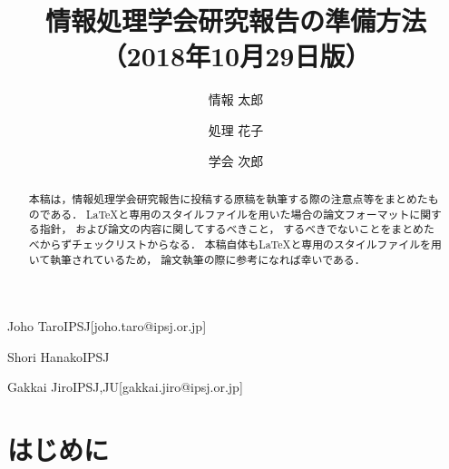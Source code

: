 \documentclass[submit,techrep,noauthor]{ipsj-lualatex}
\begin{document}
\title{情報処理学会研究報告の準備方法\\
（2018年10月29日版）}





\author{情報 太郎}{Joho Taro}{IPSJ}[joho.taro@ipsj.or.jp]
\author{処理 花子}{Shori Hanako}{IPSJ}
\author{学会 次郎}{Gakkai Jiro}{IPSJ,JU}[gakkai.jiro@ipsj.or.jp]

\begin{abstract}
本稿は，情報処理学会研究報告に投稿する原稿を執筆する際の注意点等をまとめたものである．
\LaTeX と専用のスタイルファイルを用いた場合の論文フォーマットに関する指針，
および論文の内容に関してするべきこと，
するべきでないことをまとめたべからずチェックリストからなる．
本稿自体も\LaTeX と専用のスタイルファイルを用いて執筆されているため，
論文執筆の際に参考になれば幸いである．
\end{abstract}


%
%
%

\maketitle

\section{はじめに}
\end{document}
